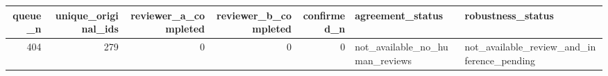 \begin{tabular}{rrrrrll}
\toprule
queue_n & unique_original_ids & reviewer_a_completed & reviewer_b_completed & confirmed_n & agreement_status & robustness_status \\
\midrule
404 & 279 & 0 & 0 & 0 & not_available_no_human_reviews & not_available_review_and_inference_pending \\
\bottomrule
\end{tabular}

